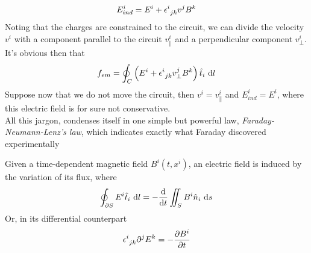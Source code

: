 \documentclass[../electromagnetism]{subfiles}
\begin{document}
\begin{equation}
	E^i_{ind}=E^i+\epsilon^{i}_{\ jk}v^jB^k
	\label{eq:faradayneumannindfield}
\end{equation}
Noting that the charges are constrained to the circuit, we can divide the velocity $v^i$ with a component parallel to the circuit $v^i_{\parallel}$ and a perpendicular component $v^i_{\perp}$. It's obvious then that
\begin{equation}
	f_{em}=\oint_C\left(E^i+\epsilon^{i}_{\ jk}v^j_{\perp}B^k\right)\hat{t}_i\ \mathrm{d} l
	\label{eq:femind}
\end{equation}
Suppose now that we do not move the circuit, then $v^i=v^i_{\parallel}$ and $E^i_{ind}=E^i$, where this electric field is for sure not conservative.\\
All this jargon, condenses itself in one simple but powerful law, \textit{Faraday-Neumann-Lenz's law}, which indicates exactly what Faraday discovered experimentally
\begin{thm}
    Given a time-dependent magnetic field $B^i(t,x^i)$, an electric field is induced by the variation of its flux, where
    \begin{equation*}
        \oint_{\partial S}E^i\hat{t}_i\ \mathrm{d} l=-\dv{t}\iint_{S}B^i\hat{n}_i\ \mathrm{d} s
    \end{equation*}
    Or, in its differential counterpart
    \begin{equation}
        \epsilon^{i}_{\ jk}\partial^jE^k=-\pdv{B^i}{t}
    \label{eq:fnldiff}
    \end{equation}
\end{thm}
\end{document}
